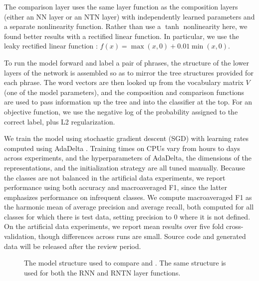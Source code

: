 The comparison layer uses the same layer function as the
composition layers (either an NN layer or an NTN layer) with
independently learned parameters and a separate nonlinearity function.
Rather than use a $\tanh$ nonlinearity here, we found better results with a rectified linear function. In
particular, we use the leaky rectified linear function
\cite{maasrectifier}: $f(x)=\max(x, 0) +
0.01\min(x, 0)$.

To run the model forward and label a pair of phrases, the structure of
the lower layers of the network is assembled so as to mirror the tree
structures provided for each phrase. The word vectors are then looked
up from the vocabulary matrix $V$ (one of the model parameters), and
the composition and comparison functions are used to pass information
up the tree and into the classifier at the top. For an objective
function, we use the negative log of the probability assigned to the
correct label, plus L2 regularization.

We train the model using stochastic gradient descent (SGD)
with learning rates computed using AdaDelta \cite{zeiler2012adadelta}.
Training times on CPUs vary from hours to days across experiments, and
the hyperparameters of AdaDelta, the dimensions of the representations,
and the initialization strategy are all tuned manually.
Because the classes are not balanced in the artificial data experiments, we report performance
using both accuracy and macroaveraged F1, since the latter emphasizes
 performance on infrequent classes. We compute macroaveraged F1 
as the harmonic mean of average precision and average recall, both computed
for all classes for which there is test data, setting precision to 0 
where it is not defined. On the artificial data experiments, we report mean
results over five fold cross-validation, though differences across runs are small.
Source code and generated data will be released after the review period.

\begin{figure}[tp]
  \centering
  
  \caption{The model structure used to compare  and . 
    The same structure is used for both the RNN and RNTN layer functions.} 
  \label{sample-figure}
\end{figure}
